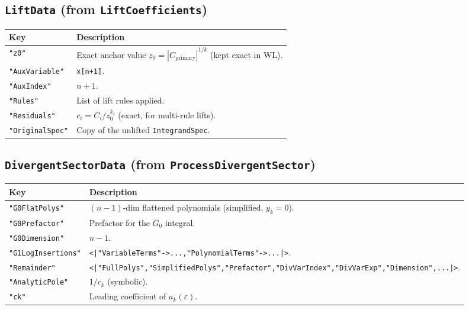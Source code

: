 \documentclass[11pt,a4paper]{article}
\begin{document}
\subsection{\texttt{LiftData} (from \texttt{LiftCoefficients})}
\begin{center}
\begin{tabular}{lp{9cm}}
\toprule
\textbf{Key} & \textbf{Description} \\
\midrule
\texttt{"z0"} & Exact anchor value $z_0=|C_{\text{primary}}|^{1/k}$ (kept exact in WL). \\
\texttt{"AuxVariable"} & \texttt{x[n+1]}. \\
\texttt{"AuxIndex"} & $n+1$. \\
\texttt{"Rules"} & List of lift rules applied. \\
\texttt{"Residuals"} & $c_i=C_i/z_0^{k_i}$ (exact, for multi-rule lifts). \\
\texttt{"OriginalSpec"} & Copy of the unlifted \texttt{IntegrandSpec}. \\
\bottomrule
\end{tabular}
\end{center}

\subsection{\texttt{DivergentSectorData} (from \texttt{ProcessDivergentSector})}
\begin{center}
\begin{tabular}{lp{9cm}}
\toprule
\textbf{Key} & \textbf{Description} \\
\midrule
\texttt{"G0FlatPolys"} & $(n{-}1)$-dim flattened polynomials (simplified, $y_k=0$). \\
\texttt{"G0Prefactor"} & Prefactor for the $G_0$ integral. \\
\texttt{"G0Dimension"} & $n-1$. \\
\texttt{"G1LogInsertions"} & \texttt{<|"VariableTerms"->...,"PolynomialTerms"->...|>}. \\
\texttt{"Remainder"} & \texttt{<|"FullPolys","SimplifiedPolys","Prefactor","DivVarIndex","DivVarExp","Dimension",...|>}. \\
\texttt{"AnalyticPole"} & $1/c_k$ (symbolic). \\
\texttt{"ck"} & Leading coefficient of $a_k(\varepsilon)$. \\
\bottomrule
\end{tabular}
\end{center}
\end{document}
